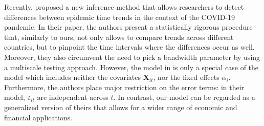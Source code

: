 \documentclass[a4paper,12pt]{article}
\makeatletter
\renewcommand{\eqref}[1]{\tagform@{\ref{#1}}}
\makeatother
\begin{document}
Recently, \cite{KhismatullinaVogt2021} proposed a new inference method that allows researchers to detect differences between epidemic time trends in the context of the COVID-19 pandemic. In their paper, the authors present a statistically rigorous procedure that, similarly to ours, not only allows to compare trends across different countries, but to pinpoint the time intervals where the differences occur as well. Moreover, they also circumvent the need to pick a bandwidth parameter by using a multiscale testing approach. However, the model in \cite{KhismatullinaVogt2021} is only a special case of the model \eqref{eq:model} which includes neither the covariates $\mathbf{X}_{it}$, nor the fixed effects $\alpha_i$. Furthermore, the authors place major restriction on the error terms: in their model, $\varepsilon_{it}$ are independent across $t$. In contrast, our model \eqref{eq:model} can be regarded as a generalized version of theirs that allows for a wider range of economic and financial applications.


\end{document}
